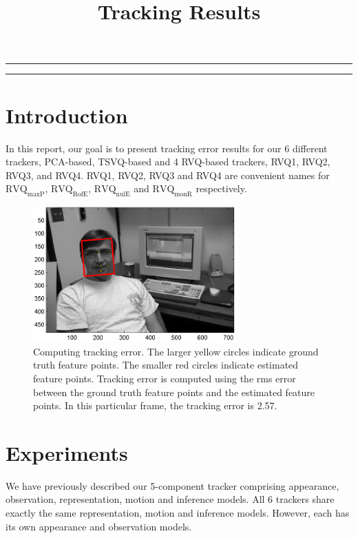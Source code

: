 
\title{Tracking Results}
\date{}

\maketitle
\rule[0pt]{\textwidth}{1pt}
\tableofcontents
\rule[0pt]{\textwidth}{1pt}
\section{Introduction}
In this report, our goal is to present tracking error results for our 6 different trackers, PCA-based, TSVQ-based and 4 RVQ-based trackers, RVQ1, RVQ2, RVQ3, and RVQ4.  RVQ1, RVQ2, RVQ3 and RVQ4 are convenient names for $\mathrm{RVQ_{maxP}}$, $\mathrm{RVQ_{RofE}}$, $\mathrm{RVQ_{nulE}}$ and $\mathrm{RVQ_{monR}}$ respectively.


								\begin{figure}[t]
								\centering
								\includegraphics[width=0.7\textwidth]{temp/results_pca__trk_dudek_0007.png}
								\caption{Computing tracking error.  The larger yellow circles indicate ground truth feature points.  The smaller red circles indicate estimated feature points.  Tracking error is computed using the rms error between the ground truth feature points and the estimated feature points.  In this particular frame, the tracking error is 2.57.}
								\label{fig:results_pca__trk_dudek_0007}
								\end{figure}
\section{Experiments}
We have previously described our 5-component tracker comprising appearance, observation, representation, motion and inference models.  All 6 trackers share exactly the same representation, motion and inference models.  However, each has its own appearance and observation models.

